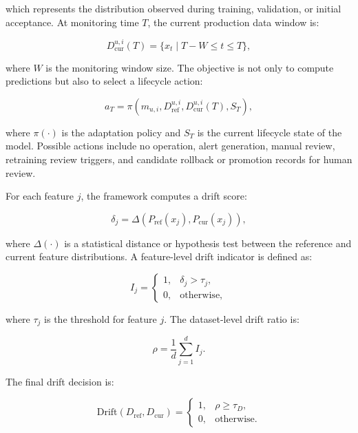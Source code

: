 \documentclass[runningheads]{llncs}
\begin{document}
which represents the distribution observed during training, validation, or initial acceptance. At monitoring time $T$, the current production data window is:

\begin{equation}
D_{\mathrm{cur}}^{u,i}(T)=\{x_t \mid T-W \leq t \leq T\},
\end{equation}

where $W$ is the monitoring window size. The objective is not only to compute predictions but also to select a lifecycle action:

\begin{equation}
a_T = \pi(m_{u,i},D_{\mathrm{ref}}^{u,i},D_{\mathrm{cur}}^{u,i}(T),S_T),
\end{equation}

where $\pi(\cdot)$ is the adaptation policy and $S_T$ is the current lifecycle state of the model. Possible actions include no operation, alert generation, manual review, retraining review triggers, and candidate rollback or promotion records for human review.

For each feature $j$, the framework computes a drift score:

\begin{equation}
\delta_j=\Delta(P_{\mathrm{ref}}(x_j),P_{\mathrm{cur}}(x_j)),
\end{equation}

where $\Delta(\cdot)$ is a statistical distance or hypothesis test between the reference and current feature distributions. A feature-level drift indicator is defined as:

\begin{equation}
I_j =
\begin{cases}
1, & \delta_j > \tau_j,\\
0, & \mathrm{otherwise},
\end{cases}
\end{equation}

where $\tau_j$ is the threshold for feature $j$. The dataset-level drift ratio is:

\begin{equation}
\rho=\frac{1}{d}\sum_{j=1}^{d}I_j.
\end{equation}

The final drift decision is:

\begin{equation}
\mathrm{Drift}(D_{\mathrm{ref}}, D_{\mathrm{cur}}) =
\begin{cases}
1, & \rho \ge \tau_D,\\
0, & \text{otherwise}.
\end{cases}
\end{equation}
\end{document}
